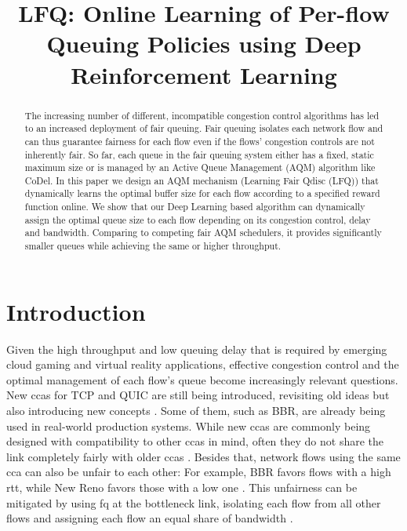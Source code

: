 \documentclass[conference]{IEEEtran}
\begin{document}
\title{LFQ: Online Learning of Per-flow Queuing Policies using Deep Reinforcement Learning}

\author{
}

\maketitle

\begin{abstract}
The increasing number of different, incompatible congestion control algorithms has led to an increased deployment of fair queuing. Fair queuing isolates each network flow and can thus guarantee fairness for each flow even if the flows' congestion controls are not inherently fair. So far, each queue in the fair queuing system either has a fixed, static maximum size or is managed by an Active Queue Management (AQM) algorithm like CoDel. In this paper we design an AQM mechanism (Learning Fair Qdisc (LFQ)) that dynamically learns the optimal buffer size for each flow according to a specified reward function online. We show that our Deep Learning based algorithm can dynamically assign the optimal queue size to each flow depending on its congestion control, delay and bandwidth. Comparing to competing fair AQM schedulers, it provides significantly smaller queues while achieving the same or higher throughput. 
\end{abstract}

\section{Introduction}
\label{sec:intro}

Given the high throughput and low queuing delay that is required by emerging cloud gaming  and virtual reality applications, effective congestion control and the optimal management of each flow's queue become increasingly relevant questions. New \glspl{cca} for TCP and QUIC are still being introduced, revisiting old ideas but also introducing new concepts \cite{dong_pcc_2018, cardwell_bbr:_2016, bachl_rax_2019}. Some of them, such as BBR, are already being used in real-world production systems. While new \glspl{cca} are commonly being designed with compatibility to other \glspl{cca} in mind, often they do not share the link completely fairly with older \glspl{cca} \cite{fejes_who_2019}. Besides that, network flows using the same \gls{cca} can also be unfair to each other: For example, BBR favors flows with a high \gls{rtt}, while New Reno favors those with a low one \cite{turkovic_interactions_2019}. This unfairness can be mitigated by using \gls{fq} at the bottleneck link, isolating each flow from all other flows and assigning each flow an equal share of bandwidth \cite{dumazet_pkt_sched:_2013}. 
 
\end{document}
